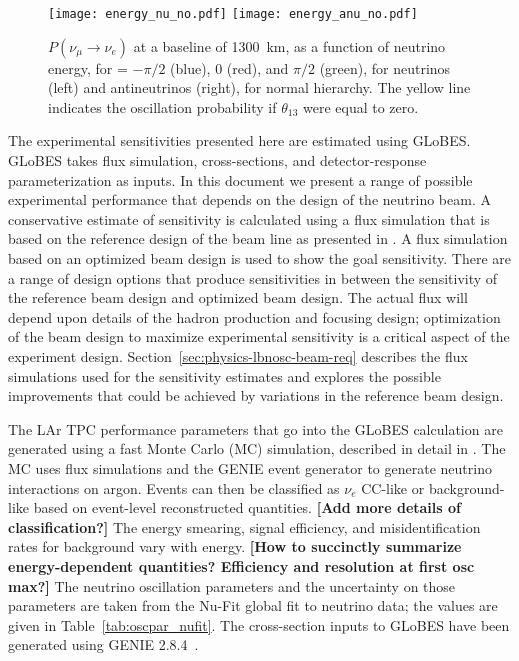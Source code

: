 \begin{figure}[!htbp]
\centering
\texttt{[image: energy\_nu\_no.pdf]}
\texttt{[image: energy\_anu\_no.pdf]}
\caption{$P(\nu_\mu \rightarrow \nu_e)$ at a baseline of 1300~km,
  as a function of neutrino energy, for \deltacp = $-\pi/2$ (blue), 
  0 (red), and $\pi/2$ (green), for neutrinos (left) and antineutrinos
  (right), for normal hierarchy. The yellow line indicates the oscillation
  probability if $\theta_{13}$ were equal to zero.}
\label{fig:oscprob}
\end{figure}

The experimental sensitivities presented here are estimated using 
GLoBES\cite{Huber:2004ka,Huber:2007ji}. GLoBES takes flux simulation, cross-sections,
and detector-response parameterization as inputs. In this document we present
a range of possible experimental performance that depends on the design of the neutrino beam.
A conservative estimate of sensitivity is calculated using a flux simulation that is based on the reference design of the beam line as presented in \vollbnf.  A flux simulation based on an optimized beam design is used to show the goal sensitivity.  There are a range of design options that produce sensitivities in between the sensitivity of the reference beam design and optimized beam design. The actual flux will depend upon details of the hadron production and focusing design; optimization of the beam design to maximize experimental sensitivity is a critical aspect of the experiment
design.  Section~\ref{sec:physics-lbnosc-beam-req} describes the flux simulations used for the sensitivity estimates and explores the possible improvements that could be achieved by variations in the reference beam design.


The LAr TPC performance parameters that go into the GLoBES calculation are generated using a fast Monte Carlo (MC) simulation, described in detail in \cite{Adams:2013qkq}.  The MC uses flux simulations and the GENIE event generator \cite{Andreopoulos:2009rq} to generate neutrino interactions on argon.  Events can then be classified as $\nu_e$ CC-like or background-like based on event-level reconstructed quantities.   {\bf [Add more details of classification?]}
The energy smearing, signal efficiency, and misidentification rates for background vary with energy. {\bf [How to succinctly summarize energy-dependent quantities? Efficiency and resolution at first osc max?]} The neutrino oscillation
parameters and the uncertainty on those parameters are taken from the 
Nu-Fit\cite{Gonzalez-Garcia:2014bfa} global fit to neutrino data; the values are given in 
Table~\ref{tab:oscpar_nufit}.  The cross-section inputs to GLoBES have been generated using GENIE 2.8.4~\cite{Andreopoulos:2009rq}.

